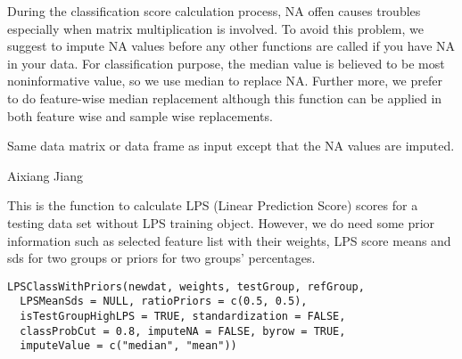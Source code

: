 \documentclass[letterpaper]{book}
\begin{document}
%
\begin{Details}\relax
During the classification score calculation process, NA offen causes troubles especially when matrix multiplication is involved. 
To avoid this problem, we suggest to impute NA values before any other functions are called if you have NA in your data. 
For classification purpose, the median value is believed to be most noninformative value, so we use median to replace NA. Further more, 
we prefer to do feature-wise median replacement although this function can be applied in both feature wise and sample wise replacements.
\end{Details}
%
\begin{Value}
Same data matrix or data frame as input except that the NA values are imputed.
\end{Value}
%
\begin{Author}\relax
Aixiang Jiang
\end{Author}
%
\begin{Description}\relax
This is the function to calculate LPS (Linear Prediction Score) scores for a testing data set 
without LPS training object. However, we do need some prior information such as selected feature list with their weights, 
LPS score means and sds for two groups or priors for two groups' percentages.
\end{Description}
%
\begin{Usage}
\begin{verbatim}
LPSClassWithPriors(newdat, weights, testGroup, refGroup,
  LPSMeanSds = NULL, ratioPriors = c(0.5, 0.5),
  isTestGroupHighLPS = TRUE, standardization = FALSE,
  classProbCut = 0.8, imputeNA = FALSE, byrow = TRUE,
  imputeValue = c("median", "mean"))
\end{verbatim}
\end{Usage}
%
\end{document}
